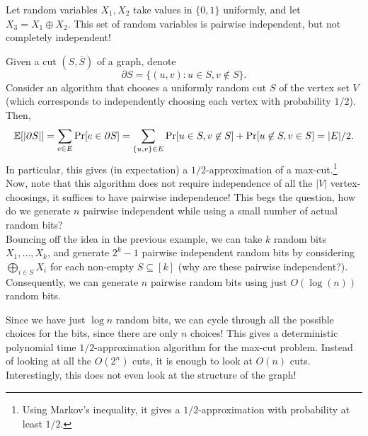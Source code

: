 			\begin{fex}
				Let random variables $X_1,X_2$ take values in $\{0,1\}$ uniformly, and let $X_3 = X_1 \oplus X_2$. This set of random variables is pairwise independent, but not completely independent!
			\end{fex}


			Given a cut $(S,\overline{S})$ of a graph, denote
			\[ \partial S = \{ (u,v) : u \in S, v \not\in S \}. \]
			Consider an algorithm that chooses a uniformly random cut $S$ of the vertex set $V$ (which corresponds to independently choosing each vertex with probability $1/2$). Then,
			\[ \mathbb{E}[|\partial S|] = \sum_{e \in E} \Pr[e \in \partial S] = \sum_{\{u,v\} \in E} \Pr[u \in S, v \not\in S] + \Pr[u \not\in S, v \in S] = |E|/2. \]
			In particular, this gives (in expectation) a $1/2$-approximation of a max-cut.\footnote{Using Markov's inequality, it gives a $1/2$-approximation with probability at least $1/2$.}\\

			Now, note that this algorithm does not require independence of all the $|V|$ vertex-choosings, it suffices to have pairwise independence! This begs the question, how do we generate $n$ pairwise independent while using a small number of actual random bits?\\
			Bouncing off the idea in the previous example, we can take $k$ random bits $X_1,\ldots,X_k$, and generate $2^k-1$ pairwise independent random bits by considering $\bigoplus_{i \in S} X_i$ for each non-empty $S \subseteq [k]$ (why are these pairwise independent?).\\
			Consequently, we can generate $n$ pairwise random bits using just $O(\log(n))$ random bits.

			\begin{remark}
				Since we have just $\log n$ random bits, we can cycle through all the possible choices for the bits, since there are only $n$ choices! This gives a deterministic polynomial time $1/2$-approximation algorithm for the max-cut problem. Instead of looking at all the $O(2^n)$ cuts, it is enough to look at $O(n)$ cuts. \\
				Interestingly, this does not even look at the structure of the graph!
			\end{remark}

